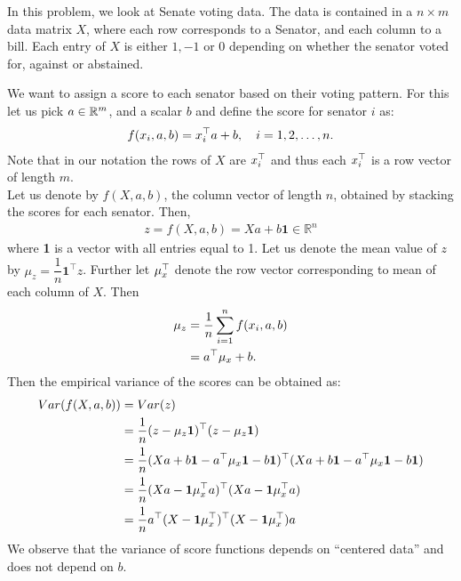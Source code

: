 In this problem, we look at Senate voting data. The data is contained in a $n \times m$ data matrix $X$, where each row corresponds to a Senator, and each column to a bill. Each entry of $X$ is either $1,-1$ or  $0$ depending on whether the senator voted for, against or abstained. 
\begin{enumerate}
    \qitem
    We want to assign a score to each senator based on their voting pattern. For this let us pick $a \in \mathbb{R}^{m}$, and a scalar $b$ and define the score for senator $i$ as:
    \begin{align*}
        f(x_i, a, b) =  x_i^{\top} a + b, \quad i = 1, 2, \hdots, n.
    \end{align*}
    Note that in our notation the rows of $X$ are $x_i^{\top}$ and thus each $x_i^{\top}$ is a row vector of length $m$.\\
    
    Let us denote by $f(X, a, b)$, the column vector of length $n$, obtained by stacking the scores for each senator. Then,
    \begin{align*}
        z = f(X, a, b) = Xa + b\textbf{1} \in \mathbb{R}^n
    \end{align*}
    where \textbf{1} is a vector with all entries equal to 1. Let us denote the mean value of $z$ by $\mu_z = \dfrac{1}{n} \textbf{1}^\top z$. Further let $\mu_x^{\top}$ denote the row vector corresponding to mean of each column of $X$. Then  
    \begin{align*}
        \mu_z &= \dfrac{1}{n}\sum\limits_{i=1}^n f(x_i, a, b)\\
             &= a^{\top} \mu_x + b. 
    \end{align*}
    Then the empirical variance of the scores can be obtained as:
    \begin{align*}
        Var(f(X,a,b)) &= Var(z) \\
                      &= \frac{1}{n} (z - \mu_z \textbf{1})^{\top} (z - \mu_z\textbf{1}) \\  
                      &= \frac{1}{n} (Xa + b\textbf{1} - a^\top \mu_x \textbf{1} - b\textbf{1})^{\top} (Xa + b\textbf{1} - a^\top \mu_x \textbf{1} - b\textbf{1}) \\  
                      &= \dfrac{1}{n} (Xa  -  \textbf{1}\mu_x^\top a )^{\top} (Xa  - \textbf{1} \mu_x^\top a ) \\
                      &= \frac{1}{n}a^{\top} (X - \textbf{1}\mu_x^{\top})^{\top} (X - \textbf{1}\mu_x^{\top})a
    \end{align*}
    We observe that the variance of score functions depends on ``centered data'' and does not depend on $b$.\\
    

\end{enumerate}
